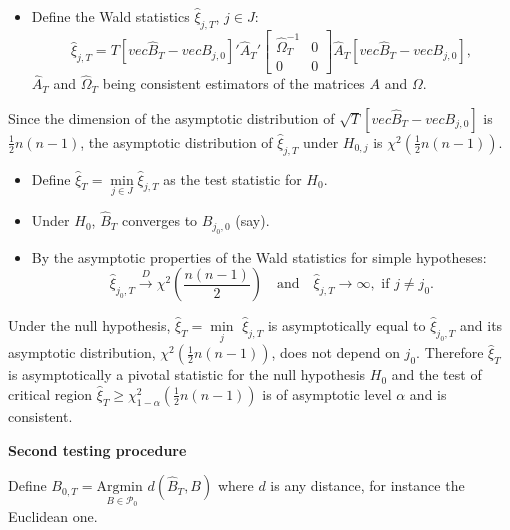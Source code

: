 \documentclass[
]{book}
\providecommand{\tightlist}{%
  \setlength{\itemsep}{0pt}\setlength{\parskip}{0pt}}
\theoremstyle{definition}
\theoremstyle{definition}
\theoremstyle{definition}
\theoremstyle{definition}
\theoremstyle{remark}
\begin{document}
\begin{itemize}
\tightlist
\item
  Define the Wald statistics \(\hat\xi_{j,T}\), \(j \in J\):
  \begin{equation}
  \hat\xi_{j,T} = T [vec\hat{B}_T-vec B_{j,0}]'\hat{A}_T'
  \left[
  \begin{array}{cc}
  \hat{\Omega}^{-1}_T & 0\\
  0&0
  \end{array}
  \right]\hat{A}_T
  [vec\hat{B}_T-vec B_{j,0}],
  \end{equation}
  \(\hat{A}_T\) and \(\hat{\Omega}_T\) being consistent estimators of the matrices \(A\) and \(\Omega\).
\end{itemize}

Since the dimension of the asymptotic distribution of \(\sqrt{T}[vec\hat{B}_T-vec B_{j,0}]\) is \(\frac{1}{2}n(n-1)\), the asymptotic distribution of \(\hat\xi_{j,T}\) under \(H_{0,j}\) is \(\chi^2\left(\frac{1}{2}n(n-1)\right)\).

\begin{itemize}
\tightlist
\item
  Define \(\hat\xi_T = \underset{j \in J}{\min} \hat\xi_{j,T}\) as the test statistic for \(H_0\).
\item
  Under \(H_0\), \(\hat{B}_T\) converges to \(B_{j_0,0}\) (say).
\item
  By the asymptotic properties of the Wald statistics for simple hypotheses:
  \begin{equation}
  \hat\xi_{j_0,T} \overset{D}{\rightarrow} \chi^2\left(\frac{n(n-1)}{2}\right) \quad \mbox{and}\quad  \hat\xi_{j,T} \rightarrow \infty, \mbox{ if } j \ne j_0.
  \end{equation}
\end{itemize}

Under the null hypothesis, \(\hat\xi_T = \underset{j}{\min}\) \(\hat\xi_{j,T}\) is asymptotically equal to \(\hat\xi_{j_0,T}\) and its asymptotic distribution, \(\chi^2\left(\frac{1}{2}n(n-1)\right)\), does not depend on \(j_0\). Therefore \(\hat\xi_T\) is asymptotically a pivotal statistic for the null hypothesis \(H_0\) and the test of critical region \(\hat\xi_T \ge \chi^2_{1-\alpha}\left(\frac{1}{2}n(n-1)\right)\) is of asymptotic level \(\alpha\) and is consistent.

\textbf{Second testing procedure}

Define \(B_{0,T} = \underset{B \in \mathcal{P}_0}{\mbox{Argmin }} d(\hat{B}_T,B)\) where \(d\) is any distance, for instance the Euclidean one.
\end{document}
